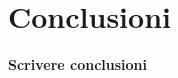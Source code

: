 \documentclass[../main.tex]{subfiles}
\begin{document}
\section{Conclusioni}

\textbf{Scrivere conclusioni}
\end{document}
